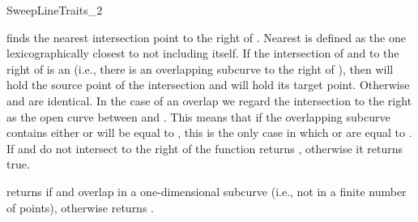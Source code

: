 \begin{ccRefConcept}{SweepLineTraits_2}





{finds the
nearest intersection point to the right of . Nearest is defined as the
one lexicographically closest to  not including  itself.
If the intersection of  and  to the
right of  is an  (i.e., there is an overlapping subcurve
to the right of ),
then  will hold the source point of the intersection and
 will hold its target point. Otherwise  and  are
identical. In the case of an overlap we regard the intersection
to the right as the open curve between  and . This means that
if the overlapping subcurve contains  either  or  will
be equal to , this is the only case in which  or  are
 equal to .
If  and  do not intersect to the right of 
the function returns , otherwise it returns true.
}

{returns  if  and  overlap
in a one-dimensional subcurve (i.e., not in a finite number
of points), otherwise returns .}



\ccHasModels
  \\
  \\
  \\
   \\
   \\


\end{ccRefConcept}
